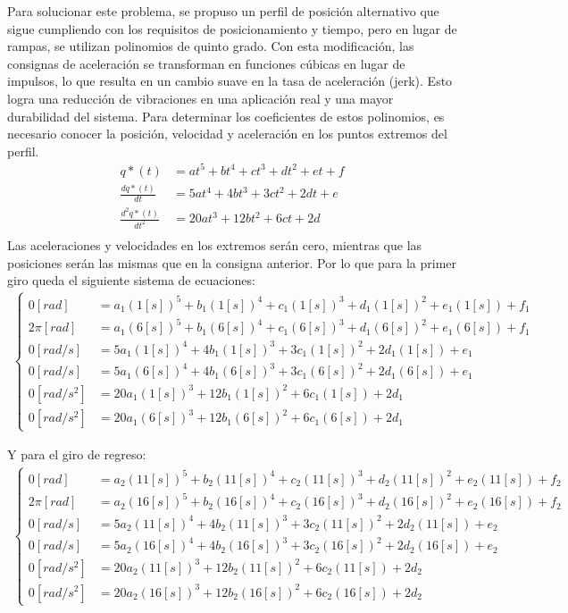 \documentclass[a4paper, 10pt, onecolumn,journal]{ieeeconf}
\begin{document}
Para solucionar este problema, se propuso un perfil de posición alternativo que sigue cumpliendo con los requisitos de posicionamiento y tiempo, pero en lugar de rampas, se utilizan polinomios de quinto grado. Con esta modificación, las consignas de aceleración se transforman en funciones cúbicas en lugar de impulsos, lo que resulta en un cambio suave en la tasa de aceleración (jerk). Esto logra una reducción de vibraciones en una aplicación real y una mayor durabilidad del sistema. Para determinar los coeficientes de estos polinomios, es necesario conocer la posición, velocidad y aceleración en los puntos extremos del perfil.
\begin{align}
	q*(t) &= at^5 + bt^4 + ct^3 + dt^2 + et + f  \\
	\frac{d q*(t)}{dt} &=  5at^4 + 4bt^3 + 3ct^2 + 2dt + e \\
	\frac{d^2 q*(t)}{dt^2} &=  20at^3 + 12bt^2 + 6ct + 2d\\
\end{align}
Las aceleraciones y velocidades en los extremos serán cero, mientras que las posiciones serán las mismas que en la consigna anterior. Por lo que para la primer giro queda el siguiente sistema de ecuaciones:
\begin{align}
	\begin{cases}
		0[rad]  &= a_1(1 [s])^5 + b_1(1 [s])^4 + c_1(1 [s])^3 + d_1(1 [s])^2 + e_1(1 [s]) + f_1 \\
		2\pi [rad] &= a_1(6 [s])^5 + b_1(6 [s])^4 + c_1(6 [s])^3 + d_1(6 [s])^2 + e_1(6 [s]) + f_1  \\
		0[rad/s] &= 5a_1(1 [s])^4 + 4b_1(1 [s])^3 + 3c_1(1 [s])^2 + 2d_1(1 [s]) + e_1 \\
		0[rad/s] &= 5a_1(6 [s])^4 + 4b_1(6 [s])^3 + 3c_1(6 [s])^2 + 2d_1(6 [s]) + e_1 \\
		0[rad/s^2] &= 20a_1(1 [s])^3 + 12b_1(1 [s])^2 + 6c_1(1 [s]) + 2d_1 \\
		0[rad/s^2] &= 20a_1(6 [s])^3 + 12b_1(6 [s])^2 + 6c_1(6 [s]) + 2d_1
	\end{cases}
\end{align}

Y para el giro de regreso:
\begin{align}
	\begin{cases}
		0[rad]  &= a_2(11 [s])^5 + b_2(11 [s])^4 + c_2(11 [s])^3 + d_2(11 [s])^2 + e_2(11 [s]) + f_2 \\
		2\pi [rad] &= a_2(16 [s])^5 + b_2(16 [s])^4 + c_2(16 [s])^3 + d_2(16 [s])^2 + e_2(16 [s]) + f_2  \\
		0[rad/s] &= 5a_2(11 [s])^4 + 4b_2(11 [s])^3 + 3c_2(11 [s])^2 + 2d_2(11 [s]) + e_2 \\
		0[rad/s] &= 5a_2(16 [s])^4 + 4b_2(16 [s])^3 + 3c_2(16 [s])^2 + 2d_2(16 [s]) + e_2 \\
		0[rad/s^2] &= 20a_2(11 [s])^3 + 12b_2(11 [s])^2 + 6c_2(11 [s]) + 2d_2 \\
		0[rad/s^2] &= 20a_2(16 [s])^3 + 12b_2(16 [s])^2 + 6c_2(16 [s]) + 2d_2
	\end{cases}
\end{align}
\end{document}
